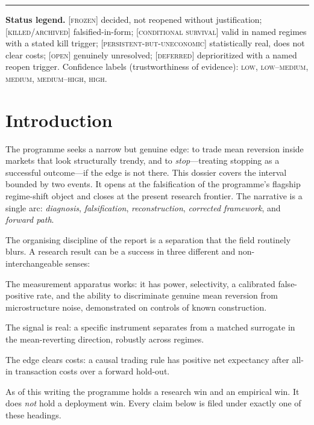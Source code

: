 \documentclass[11pt,a4paper]{article}
\newcommand{\status}[1]{{\small\textsc{[#1]}}}
\begin{document}
\vspace{0.5em}
\hrule
\vspace{0.5em}

\textbf{Status legend.}
\status{frozen} decided, not reopened without justification;
\status{killed/archived} falsified-in-form;
\status{conditional survival} valid in named regimes with a stated kill trigger;
\status{persistent-but-uneconomic} statistically real, does not clear costs;
\status{open} genuinely unresolved;
\status{deferred} deprioritized with a named reopen trigger.
Confidence labels (trustworthiness of evidence): \textsc{low, low--medium, medium, medium--high, high}.

\section{Introduction}

The programme seeks a narrow but genuine edge: to trade mean reversion inside markets that look
structurally trendy, and to \emph{stop}---treating stopping as a successful outcome---if the edge is
not there. This dossier covers the interval bounded by two events. It opens at the falsification of the
programme's flagship regime-shift object and closes at the present research frontier. The narrative is
a single arc: \emph{diagnosis}, \emph{falsification}, \emph{reconstruction}, \emph{corrected
framework}, and \emph{forward path}.

The organising discipline of the report is a separation that the field routinely blurs. A research
result can be a success in three different and non-interchangeable senses:

\begin{description}[leftmargin=1.4em,itemsep=2pt]
  \item[Research win.] The measurement apparatus works: it has power, selectivity, a calibrated
  false-positive rate, and the ability to discriminate genuine mean reversion from microstructure
  noise, demonstrated on controls of known construction.
  \item[Empirical win.] The signal is real: a specific instrument separates from a matched surrogate
  in the mean-reverting direction, robustly across regimes.
  \item[Deployment win.] The edge clears costs: a causal trading rule has positive net expectancy
  after all-in transaction costs over a forward hold-out.
\end{description}

As of this writing the programme holds a research win and an empirical win. It does \emph{not} hold a
deployment win. Every claim below is filed under exactly one of these headings.
\end{document}
